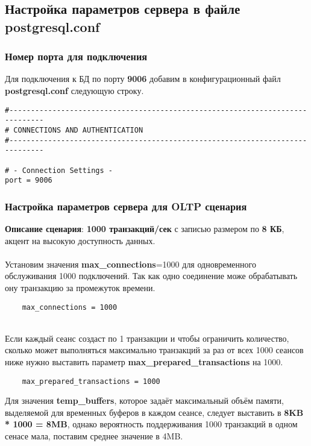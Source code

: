 \documentclass{article}
\begin{document}
\subsection{Настройка параметров сервера в файле postgresql.conf}

\subsubsection{Номер порта для подключения}
Для подключения к БД по порту \textbf{9006} добавим в конфигурационный файл \textbf{postgresql.conf} следующую строку.
\begin{verbatim}
#------------------------------------------------------------------------------
# CONNECTIONS AND AUTHENTICATION
#------------------------------------------------------------------------------

# - Connection Settings -
port = 9006
\end{verbatim}

\subsubsection{Настройка параметров сервера для OLTP сценария}
\textbf{Описание сценария}: \textbf{1000 транзакций/сек} с
записью размером по \textbf{8 КБ}, акцент на высокую доступность данных.
\\ \\
Установим значения \textbf{max\_connections}=1000 для одновременного обслуживания 1000 подключений. Так как одно соединение може обрабатывать ону транзакцию за промежуток времени.

\begin{verbatim}
    max_connections = 1000
\end{verbatim}
\\ 
Если каждый сеанс создаст по 1 транзакции и чтобы ограничить количество, сколько может выполняться максимально транзакций за раз от всех 1000 сеансов ниже нужно выставить параметр \textbf{max\_prepared\_transactions} на 1000.

\begin{verbatim}
    max_prepared_transactions = 1000
\end{verbatim}

Для значения \textbf{temp\_buffers}, которое задаёт максимальный объём памяти, выделяемой для временных буферов в каждом сеансе, следует выставить в \textbf{8KB * 1000 = 8MB}, однако вероятность поддерживания 1000 транзакций в одном сенасе мала, поставим среднее значение в 4MB.
\end{document}
